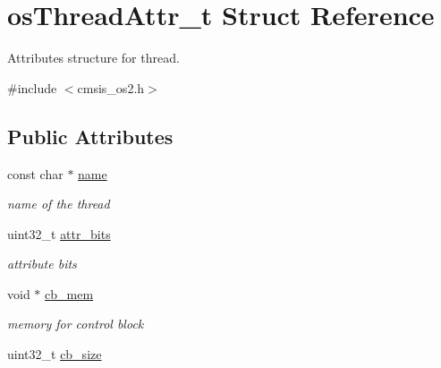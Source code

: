 \hypertarget{structos_thread_attr__t}{}\section{os\+Thread\+Attr\+\_\+t Struct Reference}
\label{structos_thread_attr__t}


Attributes structure for thread.  




{\ttfamily \#include $<$cmsis\+\_\+os2.\+h$>$}

\subsection*{Public Attributes}
\begin{DoxyCompactItemize}
\item 
\mbox{\label{structos_thread_attr__t_aed20d9f112c97dcb4fc6374290ab7446}} 
const char $\ast$ \mbox{\hyperlink{structos_thread_attr__t_aed20d9f112c97dcb4fc6374290ab7446}{name}}
\begin{DoxyCompactList}\small\item\em name of the thread \end{DoxyCompactList}\item 
\mbox{\label{structos_thread_attr__t_a5f48a821ddc41410fe625860b6380d3a}} 
uint32\+\_\+t \mbox{\hyperlink{structos_thread_attr__t_a5f48a821ddc41410fe625860b6380d3a}{attr\+\_\+bits}}
\begin{DoxyCompactList}\small\item\em attribute bits \end{DoxyCompactList}\item 
\mbox{\label{structos_thread_attr__t_a378962e098d6fc89cd0bdecaf03b59de}} 
void $\ast$ \mbox{\hyperlink{structos_thread_attr__t_a378962e098d6fc89cd0bdecaf03b59de}{cb\+\_\+mem}}
\begin{DoxyCompactList}\small\item\em memory for control block \end{DoxyCompactList}\item 
\mbox{\label{structos_thread_attr__t_a8992f7ce1ac52bb8682ccd4f42751de5}} 
uint32\+\_\+t \mbox{\hyperlink{structos_thread_attr__t_a8992f7ce1ac52bb8682ccd4f42751de5}{cb\+\_\+size}}

\end{DoxyCompactItemize}
